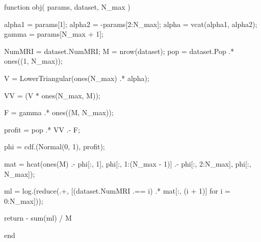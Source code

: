 \documentclass[
  letterpaper,
  DIV=11,
  numbers=noendperiod]{scrreprt}
\newenvironment{Shaded}{\begin{snugshade}}{\end{snugshade}}
\newcommand{\CharTok}[1]{\textcolor[rgb]{0.13,0.47,0.30}{#1}}
\newcommand{\ControlFlowTok}[1]{\textcolor[rgb]{0.00,0.23,0.31}{#1}}
\newcommand{\FloatTok}[1]{\textcolor[rgb]{0.68,0.00,0.00}{#1}}
\newcommand{\FunctionTok}[1]{\textcolor[rgb]{0.28,0.35,0.67}{#1}}
\newcommand{\KeywordTok}[1]{\textcolor[rgb]{0.00,0.23,0.31}{#1}}
\newcommand{\NormalTok}[1]{\textcolor[rgb]{0.00,0.23,0.31}{#1}}
\newcommand{\OperatorTok}[1]{\textcolor[rgb]{0.37,0.37,0.37}{#1}}
\begin{document}
\begin{Shaded}
\begin{Highlighting}[]
\KeywordTok{function} \FunctionTok{obj}\NormalTok{(}
\NormalTok{        params,}
\NormalTok{        dataset,}
\NormalTok{        N\_max}
\NormalTok{    )}

\NormalTok{    alpha1 }\OperatorTok{=}\NormalTok{ params[}\FloatTok{1}\NormalTok{];}
\NormalTok{    alpha2 }\OperatorTok{=} \OperatorTok{{-}}\NormalTok{params[}\FloatTok{2}\OperatorTok{:}\NormalTok{N\_max];}
\NormalTok{    alpha }\OperatorTok{=} \FunctionTok{vcat}\NormalTok{(alpha1, alpha2);}
\NormalTok{    gamma }\OperatorTok{=}\NormalTok{ params[N\_max }\OperatorTok{+} \FloatTok{1}\NormalTok{];}
    
\NormalTok{    NumMRI }\OperatorTok{=}\NormalTok{ dataset.NumMRI;}
\NormalTok{    M }\OperatorTok{=} \FunctionTok{nrow}\NormalTok{(dataset);}
\NormalTok{    pop }\OperatorTok{=}\NormalTok{ dataset.Pop }\OperatorTok{.*} \FunctionTok{ones}\NormalTok{((}\FloatTok{1}\NormalTok{, N\_max));}
    
\NormalTok{    V }\OperatorTok{=} \FunctionTok{LowerTriangular}\NormalTok{(}\FunctionTok{ones}\NormalTok{(N\_max) }\OperatorTok{.*}\NormalTok{ alpha}\OperatorTok{\textquotesingle{}}\NormalTok{);}
        
\NormalTok{    VV }\OperatorTok{=}\NormalTok{ (V }\OperatorTok{*} \FunctionTok{ones}\NormalTok{(N\_max, M))}\CharTok{\textquotesingle{};}
    
\NormalTok{    F }\OperatorTok{=}\NormalTok{ gamma }\OperatorTok{.*} \FunctionTok{ones}\NormalTok{((M, N\_max));}
    
\NormalTok{    profit }\OperatorTok{=}\NormalTok{ pop }\OperatorTok{.*}\NormalTok{ VV }\OperatorTok{.{-}}\NormalTok{ F;}
    
\NormalTok{    phi }\OperatorTok{=} \FunctionTok{cdf}\NormalTok{.(}\FunctionTok{Normal}\NormalTok{(}\FloatTok{0}\NormalTok{, }\FloatTok{1}\NormalTok{), profit);}
    
\NormalTok{    mat }\OperatorTok{=} \FunctionTok{hcat}\NormalTok{(}\FunctionTok{ones}\NormalTok{(M) }\OperatorTok{.{-}}\NormalTok{ phi[}\OperatorTok{:}\NormalTok{, }\FloatTok{1}\NormalTok{], phi[}\OperatorTok{:}\NormalTok{, }\FloatTok{1}\OperatorTok{:}\NormalTok{(N\_max }\OperatorTok{{-}} \FloatTok{1}\NormalTok{)] }\OperatorTok{.{-}}\NormalTok{ phi[}\OperatorTok{:}\NormalTok{, }\FloatTok{2}\OperatorTok{:}\NormalTok{N\_max], phi[}\OperatorTok{:}\NormalTok{, N\_max]);}
    
\NormalTok{    ml }\OperatorTok{=} \FunctionTok{log}\NormalTok{.(}\FunctionTok{reduce}\NormalTok{(}\OperatorTok{.+}\NormalTok{, [(dataset.NumMRI }\OperatorTok{.==}\NormalTok{ i) }\OperatorTok{.*}\NormalTok{ mat[}\OperatorTok{:}\NormalTok{, (i }\OperatorTok{+} \FloatTok{1}\NormalTok{)] for i }\OperatorTok{=} \FloatTok{0}\OperatorTok{:}\NormalTok{N\_max]));}
    
    \ControlFlowTok{return} \OperatorTok{{-}} \FunctionTok{sum}\NormalTok{(ml) }\OperatorTok{/}\NormalTok{ M}
    
\KeywordTok{end}
\end{Highlighting}
\end{Shaded}
\end{document}
